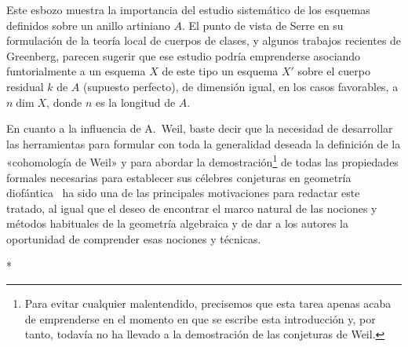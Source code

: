 Este esbozo muestra la importancia del estudio sistemático de los esquemas definidos sobre un anillo artiniano $A$.
El punto de vista de Serre en su formulación de la teoría local de cuerpos de clases, y algunos trabajos recientes de Greenberg, parecen sugerir que ese estudio podría emprenderse asociando funtorialmente a un esquema $X$ de este tipo un esquema $X'$ sobre el cuerpo residual $k$ de $A$ (supuesto perfecto), de dimensión igual, en los casos favorables, a $n\dim X$, donde $n$ es la longitud de $A$.

En cuanto a la influencia de A.~Weil, baste decir que la necesidad de desarrollar las herramientas para formular con toda la generalidad deseada la definición de la «cohomología de Weil» y para abordar la demostración\footnote{Para evitar cualquier malentendido, precisemos que esta tarea apenas acaba de emprenderse en el momento en que se escribe esta introducción y, por tanto, todavía no ha llevado a la demostración de las conjeturas de Weil.} de todas las propiedades formales necesarias para establecer sus célebres conjeturas en geometría diofántica~\cite{I-19} ha sido una de las principales motivaciones para redactar este tratado, al igual que el deseo de encontrar el marco natural de las nociones y métodos habituales de la geometría algebraica y de dar a los autores la oportunidad de comprender esas nociones y técnicas.

\bigskip
\begin{center}*\quad*\quad*\end{center}
\bigskip
